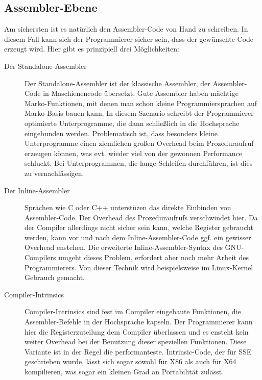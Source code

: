\documentclass[a4paper,10pt]{article}
\begin{document}
\subsection{Assembler-Ebene}

Am sichersten ist es natürlich den Assembler-Code von Hand zu schreiben. In diesem Fall kann sich
der Programmierer sicher sein, dass der gewünschte Code erzeugt wird. Hier gibt es prinzipiell drei
Möglichkeiten:

\begin{description}

    \item[Der Standalone-Assembler] Der Standalone-Assembler ist der klassische Assembler, der
    Assembler-Code in Maschienencode übersetzt. Gute Assembler haben mächtige Marko-Funktionen, mit
    denen man schon kleine Programmiersprachen auf Marko-Basis bauen kann. In diesem Szenario
    schreibt der Programmierer optimierte Unterprogramme, die dann schließlich in die Hochsprache
    eingebunden werden. Problematisch ist, dass besonders kleine Unterprogramme einen ziemlichen
    großen Overhead beim Prozeduraufruf erzeugen können, was evt. wieder viel von der gewonnen
    Performance schluckt. Bei Unterprogrammen, die lange Schleifen durchführen, ist dies zu
    vernachlässigen.

    \item[Der Inline-Assembler] Sprachen wie C oder C++ unterstüzen das direkte Einbinden von
    Assembler-Code.  Der Overhead des Prozeduraufrufs verschwindet hier. Da der Compiler allerdings
    nicht sicher sein kann, welche Register gebraucht werden, kann vor und nach dem
    Inline-Assembler-Code ggf. ein gewisser Overhead enstehen. Die erweiterte
    Inline-Assembler-Syntax des GNU-Compilers umgeht dieses Problem, erfordert aber noch mehr
    Arbeit des Programmierers. Von dieser Technik wird beispielsweise im Linux-Kernel Gebrauch
    gemacht.

    \item[Compiler-Intrinsics] Compiler-Intrinsics sind fest im Compiler eingebaute Funktionen, die
    Assembler-Befehle in der Hochsprache kapseln. Der Programmierer kann hier die Registerzuteilung
    dem Compiler überlassen und es ensteht kein weiter Overhead bei der Benutzung dieser speziellen
    Funktionen. Diese Variante ist in der Regel die performanteste.  Intrinsic-Code, der für SSE
    geschrieben wurde, lässt sich sogar sowohl für X86 als auch für X64 kompilieren, was sogar ein
    kleinen Grad an Portabilität zulässt.

\end{description}
\end{document}
